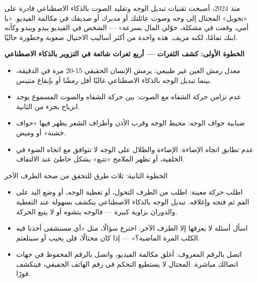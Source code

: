 منذ 2024، أصبحت تقنيات تبديل الوجه وتقليد الصوت بالذكاء الاصطناعي قادرة على «تحويل» المحتال إلى وجه وصوت عائلتك أو مديرك أو صديقك في مكالمة الفيديو. «يا أمي، وقعت في مشكلة، حوّلي المال بسرعة» — الشخص في الفيديو يبدو ويبدو وكأنه ابنك تمامًا، لكنه مزيف. هذه واحدة من أكثر أساليب الاحتيال صعوبة وخطورة حاليًا.

\textbf{الخطوة الأولى: كشف الثغرات — أربع ثغرات شائعة في التزوير بالذكاء الاصطناعي}\par

\begin{itemize}
  \item معدل رمش العين غير طبيعي: يرمش الإنسان الحقيقي 15-20 مرة في الدقيقة، بينما تبديل الوجه بالذكاء الاصطناعي غالبًا أقل رمشًا أو بإيقاع متيبس.
  \item عدم تزامن حركة الشفاه مع الصوت: بين حركة الشفاه والصوت المسموع يوجد انزياح بجزء من الثانية.
  \item ضبابية حواف الوجه: محيط الوجه وقرب الأذن وأطراف الشعر يظهر فيها «حواف خشنة» أو وميض.
  \item عدم تطابق اتجاه الإضاءة: الإضاءة والظلال على الوجه لا تتوافق مع اتجاه الضوء في الخلفية، أو تظهر الملامح «تتبع» بشكل خاطئ عند الالتفاف.
\end{itemize}

\begin{tcbinfo}{الخطوة الثانية: ثلاث طرق للتحقق من صحة الطرف الآخر}
\begin{itemize}
  \item اطلب حركة معينة: اطلب من الطرف التحول، أو تغطية الوجه، أو وضع اليد على الفم ثم فتحه وإغلاقه. تبديل الوجه بالذكاء الاصطناعي ينكشف بسهولة عند التغطية والدوران بزاوية كبيرة — فالوجه يتشوه أو لا يتبع الحركة.
  \item اسأل أسئلة لا يعرفها إلا الطرف الآخر: اخترع سؤالًا، مثل «أي مستشفى أخذنا فيه الكلب المرة الماضية؟» — إذا كان محتالًا، فلن يجيب أو سيتلعثم.
  \item اتصل بالرقم المعروف: أغلق مكالمة الفيديو، واتصل بالرقم المحفوظ في جهات اتصالك مباشرة. المحتال لا يستطيع التحكم في رقم الهاتف الحقيقي، فينكشف فورًا.
\end{itemize}

\end{tcbinfo}

